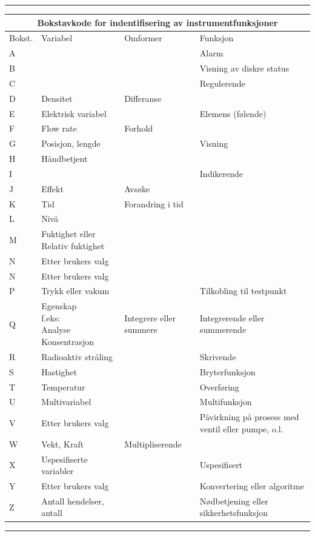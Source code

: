 \documentclass[10pt,a5paper]{article}
\begin{document}
\hrule
\small
\begin{center}
\begin{tabular}{ | m{1cm} | m{2.5cm}| m{2cm} | m{2.5cm} |} 
\hline
\multicolumn{4}{|c|}{Bokstavkode for indentifisering av instrumentfunksjoner} \\
\hline
	Bokst. & Variabel& Omformer & Funksjon \\ 
\hline
	A&&&Alarm\\
\hline
	B&&&Visning av diskre status\\
\hline
	C&&&Regulerende\\
\hline
	D&Densitet&Differanse&\\
\hline
	E&Elektrisk variabel&&Elemens (følende)\\
\hline
	F&Flow rate&Forhold&\\
\hline
	G&Posisjon, lengde&&Visning\\
\hline
	H&Håndbetjent&&\\
	\hline
	I&&&Indikerende\\
	\hline
	J&Effekt&Avsøke&\\
	\hline
	K&Tid&Forandring i tid&\\
	\hline
	L&Nivå&&\\
	\hline
	M&Fuktighet eller Relativ fuktighet&&\\
	\hline
	N&Etter brukers valg&&\\
	\hline
	N&Etter brukers valg&&\\
	\hline
	P&Trykk eller vakum&&Tilkobling til testpunkt\\
	\hline
	Q&\makecell{Egenskap\\f.eks:\\*Analyse\\*Konsentrasjon}&Integrere eller summere&Integrerende eller summerende\\
	\hline
	R&Radioaktiv stråling&&Skrivende\\
	\hline
	S&Hastighet&&Bryterfunksjon\\
	\hline
	T&Temperatur&&Overføring\\
	\hline
	U&Multivariabel&&Multifunksjon\\
	\hline
	V&Etter brukers valg& &Påvirkning på prosess med ventil eller pumpe, o.l.\\
	\hline
	W&Vekt, Kraft&Multipliserende&\\
	\hline
	X&Uspesifiserte variabler&&Uspesifisert\\
	\hline
	Y&Etter brukers valg&&Konvertering eller algoritme\\
	\hline
	Z&Antall hendelser, antall&&Nødbetjening eller sikkerhetsfunksjon\\
\hline
\end{tabular}
\end{center}
\normalsize
\vskip 5pt
\hrule
\end{document}
